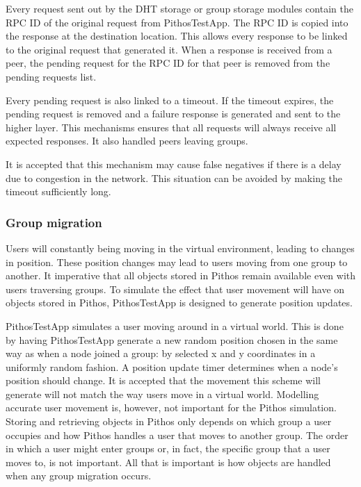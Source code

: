     Every request sent out by the DHT storage or group storage modules contain the RPC ID of the original request from PithosTestApp. The RPC ID is copied into the response at the destination location. This allows every response to be linked to the original request that generated it. When a response is received from a peer, the pending request for the RPC ID for that peer is removed from the pending requests list.

    Every pending request is also linked to a timeout. If the timeout expires, the pending request is removed and a failure response is generated and sent to the higher layer. This mechanisms ensures that all requests will always receive all expected responses. It also handled peers leaving groups.

    It is accepted that this mechanism may cause false negatives if there is a delay due to congestion in the network. This situation can be avoided by making the timeout sufficiently long.

    \subsubsection{Group migration}
    \label{group_migration_implementation}

    Users will constantly being moving in the virtual environment, leading to changes in position. These position changes may lead to users moving from one group to another. It imperative that all objects stored in Pithos remain available even with users traversing groups. To simulate the effect that user movement will have on objects stored in Pithos, PithosTestApp is designed to generate position updates.

    PithosTestApp simulates a user moving around in a virtual world. This is done by having PithosTestApp generate a new random position chosen in the same way as when a node joined a group: by selected x and y coordinates in a uniformly random fashion. A position update timer determines when a node's position should change. It is accepted that the movement this scheme will generate will not match the way users move in a virtual world. Modelling accurate user movement is, however, not important for the Pithos simulation. Storing and retrieving objects in Pithos only depends on which group a user occupies and how Pithos handles a user that moves to another group. The order in which a user might enter groups or, in fact, the specific group that a user moves to, is not important. All that is important is how objects are handled when any group migration occurs.

